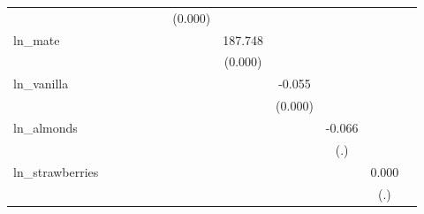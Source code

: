 \begin{table}[htbp]
\begin{tabular}{l*{11}{c}}
            &                     &                     &                     &                     &                     &     (0.000)         &                     &                     &                     &                     &                     \\
\addlinespace
ln\_mate     &                     &                     &                     &                     &                     &                     &     187.748\sym{***}&                     &                     &                     &                     \\
            &                     &                     &                     &                     &                     &                     &     (0.000)         &                     &                     &                     &                     \\
\addlinespace
ln\_vanilla  &                     &                     &                     &                     &                     &                     &                     &      -0.055\sym{***}&                     &                     &                     \\
            &                     &                     &                     &                     &                     &                     &                     &     (0.000)         &                     &                     &                     \\
\addlinespace
ln\_almonds  &                     &                     &                     &                     &                     &                     &                     &                     &      -0.066         &                     &                     \\
            &                     &                     &                     &                     &                     &                     &                     &                     &         (.)         &                     &                     \\
\addlinespace
ln\_strawberries&                     &                     &                     &                     &                     &                     &                     &                     &                     &       0.000         &                     \\
            &                     &                     &                     &                     &                     &                     &                     &                     &                     &         (.)         &                     \\

\end{tabular}
\end{table}
